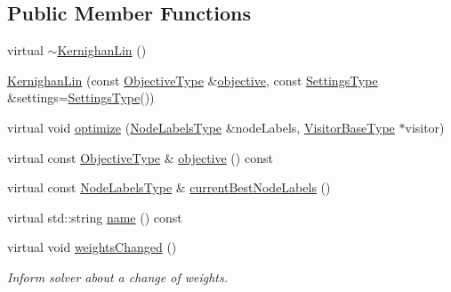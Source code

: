 \subsection*{Public Member Functions}
\begin{DoxyCompactItemize}
\item 
virtual \hyperlink{classnifty_1_1graph_1_1opt_1_1multicut_1_1KernighanLin_aa12c8039f5aa090c1e72fdeb288bca99}{$\sim$\+Kernighan\+Lin} ()
\item 
\hyperlink{classnifty_1_1graph_1_1opt_1_1multicut_1_1KernighanLin_aef948071eefc0b7dfa13197aa6f92bb9}{Kernighan\+Lin} (const \hyperlink{classnifty_1_1graph_1_1opt_1_1multicut_1_1KernighanLin_aa5a1c5a577ff9d17db32d5871da3ed45}{Objective\+Type} \&\hyperlink{classnifty_1_1graph_1_1opt_1_1multicut_1_1KernighanLin_a66a62895fd9b83f0ca17e45bd6a6eb29}{objective}, const \hyperlink{structnifty_1_1graph_1_1opt_1_1multicut_1_1KernighanLin_1_1SettingsType}{Settings\+Type} \&settings=\hyperlink{structnifty_1_1graph_1_1opt_1_1multicut_1_1KernighanLin_1_1SettingsType}{Settings\+Type}())
\item 
virtual void \hyperlink{classnifty_1_1graph_1_1opt_1_1multicut_1_1KernighanLin_a5ec3fa23df487a593127fb29dbccfc24}{optimize} (\hyperlink{classnifty_1_1graph_1_1opt_1_1multicut_1_1KernighanLin_acc82419d254c543b753b17fd26ef0818}{Node\+Labels\+Type} \&node\+Labels, \hyperlink{classnifty_1_1graph_1_1opt_1_1multicut_1_1KernighanLin_a04b6ab578786c0fae38522f49a6a9686}{Visitor\+Base\+Type} $\ast$visitor)
\item 
virtual const \hyperlink{classnifty_1_1graph_1_1opt_1_1multicut_1_1KernighanLin_aa5a1c5a577ff9d17db32d5871da3ed45}{Objective\+Type} \& \hyperlink{classnifty_1_1graph_1_1opt_1_1multicut_1_1KernighanLin_a66a62895fd9b83f0ca17e45bd6a6eb29}{objective} () const
\item 
virtual const \hyperlink{classnifty_1_1graph_1_1opt_1_1multicut_1_1KernighanLin_acc82419d254c543b753b17fd26ef0818}{Node\+Labels\+Type} \& \hyperlink{classnifty_1_1graph_1_1opt_1_1multicut_1_1KernighanLin_ae7382c0fc906c39ecf546ff84dede91f}{current\+Best\+Node\+Labels} ()
\item 
virtual std\+::string \hyperlink{classnifty_1_1graph_1_1opt_1_1multicut_1_1KernighanLin_a0e6302dd8fad769a31a8cea2df10465f}{name} () const
\item 
virtual void \hyperlink{classnifty_1_1graph_1_1opt_1_1multicut_1_1KernighanLin_ab1238ad81c57f105502a940986e9ffaf}{weights\+Changed} ()
\begin{DoxyCompactList}\small\item\em Inform solver about a change of weights. \end{DoxyCompactList}\end{DoxyCompactItemize}


